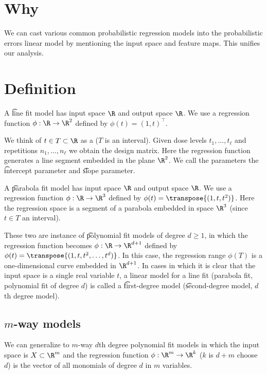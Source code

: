 

\section*{Why}

We can cast various common probabilistic regression models into the probabilistic errors linear model by mentioning the input space and feature maps.
This unifies our analysis.

\section*{Definition}


A \t{line fit model} has input space $\R $ and output space $\R $.
We use a regression function $\phi : \R  \to \R ^2$ defined by $\phi (t) = (1, t)^\top $.

We think of $t \in T \subset \R $ as a  ($T$ is an interval).
Given dose levels $t_1, \dots , t_\ell $ and repetitions $n_1, \dots , n_\ell $ we obtain the design matrix.
Here the regression function generates a line segment embedded in the plane $\R ^2$.
We call the parameters the \t{intercept parameter} and \t{slope parameter}.

A \t{parabola fit model} has input space $\R $ and output space $\R $.
We use a regression function $\phi : \R  \to \R ^3$ defined by $\phi (t) = \transpose{(1, t, t^2)}$.
Here the regression space is a segment of a parabola embedded in space $\R ^3$ (since $t \in T$ an interval).

These two are instance of \t{polynomial fit models} of degree $d \geq 1$, in which the regression function becomes $\phi : \R \to \R ^{d + 1}$ defined by $\phi (t) = \transpose{(1, t, t^2, \dots , t^d)}$.
In this case, the regression range $\phi (T)$ is a one-dimensional curve embedded in $\R ^{d+1}$.
In cases in which it is clear that the input space is a single real variable $t$, a linear model for a line fit (parabola fit, polynomial fit of degree $d$) is called a \t{first-degree model} (\t{second-degree model}, \t{$d$th degree model}).

\subsection*{$m$-way models}

We can generalize to \t{$m$-way $d$th degree polynomial fit models} in which the input space is $X \subset \R ^m$ and the regression function $\phi : \R ^m \to \R ^k$ ($k$ is $d+m$ choose $d$) is the vector of all monomials of degree $d$ in $m$ variables.


